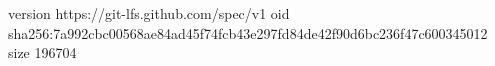 version https://git-lfs.github.com/spec/v1
oid sha256:7a992cbc00568ae84ad45f74fcb43e297fd84de42f90d6bc236f47c600345012
size 196704
